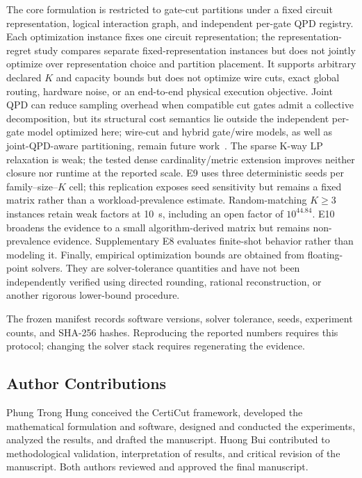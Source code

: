 \documentclass[11pt]{article}
\newcommand{\CertiCut}{CertiCut}
\newcommand{\CertiCut}{\textsc{CertiCut}}
\begin{document}
The core formulation is restricted to gate-cut partitions under a fixed circuit representation, logical interaction graph, and independent per-gate QPD registry. Each optimization instance fixes one circuit representation; the representation-regret study compares separate fixed-representation instances but does not jointly optimize over representation choice and partition placement. It supports arbitrary declared $K$ and capacity bounds but does not optimize wire cuts, exact global routing, hardware noise, or an end-to-end physical execution objective. Joint QPD can reduce sampling overhead when compatible cut gates admit a collective decomposition, but its structural cost semantics lie outside the independent per-gate model optimized here; wire-cut and hybrid gate/wire models, as well as joint-QPD-aware partitioning, remain future work~\cite{schmitt2025}. The sparse K-way LP relaxation is weak; the tested dense cardinality/metric extension improves neither closure nor runtime at the reported scale. E9 uses three deterministic seeds per family--size--$K$ cell; this replication exposes seed sensitivity but remains a fixed matrix rather than a workload-prevalence estimate. Random-matching $K\geq3$ instances retain weak factors at 10~s, including an open factor of $10^{44.84}$. E10 broadens the evidence to a small algorithm-derived matrix but remains non-prevalence evidence. Supplementary E8 evaluates finite-shot behavior rather than modeling it. Finally, empirical optimization bounds are obtained from floating-point solvers. They are solver-tolerance quantities and have not been independently verified using directed rounding, rational reconstruction, or another rigorous lower-bound procedure.

The frozen manifest records software versions, solver tolerance, seeds, experiment counts, and SHA-256 hashes. Reproducing the reported numbers requires this protocol; changing the solver stack requires regenerating the evidence.

\ifdefined\quantumversion
\subsection{Author Contributions}
Phung Trong Hung conceived the \CertiCut{} framework, developed the mathematical formulation and software, designed and conducted the experiments, analyzed the results, and drafted the manuscript. Huong Bui contributed to methodological validation, interpretation of results, and critical revision of the manuscript. Both authors reviewed and approved the final manuscript.
\fi
\end{document}
